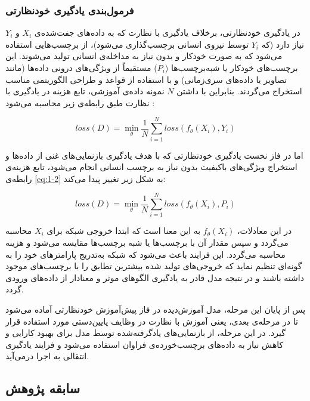 \subsubsection{فرمول‌بندی یادگیری خودنظارتی}

در یادگیری خودنظارتی، برخلاف یادگیری با نظارت که به داده‌های جفت‌شده‌ی $X_i$ و $Y_i$ نیاز دارد (که $Y_i$ توسط نیروی انسانی برچسب‌گذاری می‌شود)، از برچسب‌هایی استفاده می‌شود که به صورت خودکار و بدون نیاز به مداخله‌ی انسانی تولید می‌شوند. این برچسب‌های خودکار یا شبه‌برچسب‌ها ($P_i$) مستقیماً از ویژگی‌های درونی داده‌ها (مانند تصاویر یا داده‌های سری‌زمانی) و با استفاده از قواعد و طراحی الگوریتمی مناسب استخراج می‌گردند. بنابراین با داشتن $N$ نمونه داده‌ی آموزشی، تابع هزینه در یادگیری با نظارت طبق رابطه‌ی زیر محاسبه می‌شود \cite{jing2020self}:

\begin{equation}
\label{eq:1-2}
loss(D) = \min_{\theta} \frac{1}{N} \sum_{i=1}^{N} loss(f_θ(X_i), Y_i)
\end{equation}

اما در فاز نخست یادگیری خودنظارتی که با هدف یادگیری بازنمایی‌های غنی از داده‌ها و استخراج ویژگی‌های باکیفیت بدون نیاز به برچسب انسانی انجام می‌شود، تابع هزینه‌ی رابطه‌ی \ref{eq:1-2} به شکل زیر تغییر پیدا می‌کند:

\begin{equation}
\label{eq:2-2}
loss(D) = \min_{\theta} \frac{1}{N} \sum_{i=1}^{N} loss(f_θ(X_i), P_i)
\end{equation}

در این معادلات، $f_θ(X_i)$ به این معنا است که ابتدا خروجی شبکه برای $X_i$ محاسبه می‌گردد و سپس مقدار آن با برچسب‌ها یا شبه برچسب‌ها مقایسه می‌شود و هزینه محاسبه می‌گردد. این فرایند باعث می‌شود که شبکه به‌تدریج پارامترهای خود را به گونه‌ای تنظیم نماید که خروجی‌های تولید شده بیشترین تطابق را با برچسب‌های موجود داشته باشند و در نتیجه مدل قادر به یادگیری الگوهای موثر و معنادار از داده‌های ورودی گردد.

پس از پایان این مرحله، مدل آموزش‌دیده در فاز پیش‌آموزش خودنظارتی آماده می‌شود تا در مرحله‌ی بعدی، یعنی آموزش با نظارت در وظایف پایین‌دستی مورد استفاده قرار گیرد. در این مرحله، از بازنمایی‌های یادگرفته‌شده توسط مدل برای بهبود کارایی و کاهش نیاز به داده‌های برچسب‌خورده‌ی فراوان استفاده می‌شود و فرایند یادگیری انتقالی به اجرا درمی‌آید.

\subsection{سابقه پژوهش}

